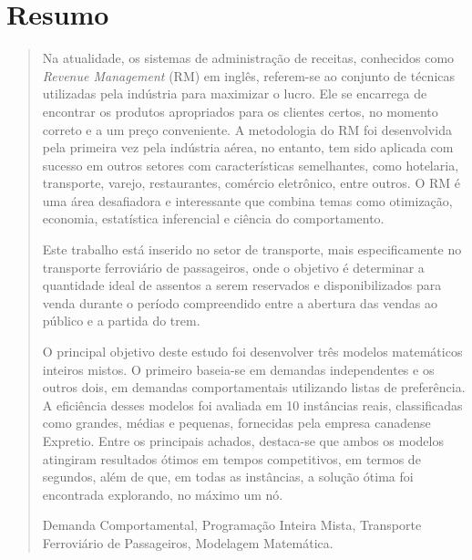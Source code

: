 \chapter*{Resumo}

\vspace{-1.0cm}
\begin{quotation}
	Na atualidade, os sistemas de administração de receitas, conhecidos como { \it Revenue Management} (RM) em inglês, referem-se ao conjunto de técnicas utilizadas pela indústria para maximizar o lucro. Ele se encarrega de encontrar os produtos apropriados para os clientes certos, no momento correto e a um preço conveniente. A metodologia do RM foi desenvolvida pela primeira vez pela indústria aérea, no entanto, tem sido aplicada com sucesso em outros setores com características semelhantes, como hotelaria, transporte, varejo, restaurantes, comércio eletrônico, entre outros. O RM é uma área desafiadora e interessante que combina temas como otimização, economia, estatística inferencial e ciência do comportamento.

	Este trabalho está inserido no setor de transporte, mais especificamente no transporte ferroviário de passageiros, onde o objetivo é determinar a quantidade ideal de assentos a serem reservados e disponibilizados para venda durante o período compreendido entre a abertura das vendas ao público e a partida do trem.

	O principal objetivo deste estudo foi desenvolver três modelos matemáticos inteiros mistos. O primeiro baseia-se em demandas independentes e os outros dois, em demandas comportamentais utilizando listas de preferência. A eficiência desses modelos foi avaliada em 10 instâncias reais, classificadas como grandes, médias e pequenas, fornecidas pela empresa canadense Expretio. Entre os principais achados, destaca-se que ambos os modelos atingiram resultados ótimos em tempos competitivos, em termos de segundos, além de que, em todas as instâncias, a solução ótima foi encontrada explorando, no máximo um nó.

	\vspace{0.5cm}

	 Demanda Comportamental, Programação Inteira Mista, Transporte Ferroviário de Passageiros, Modelagem Matemática.

\end{quotation}

